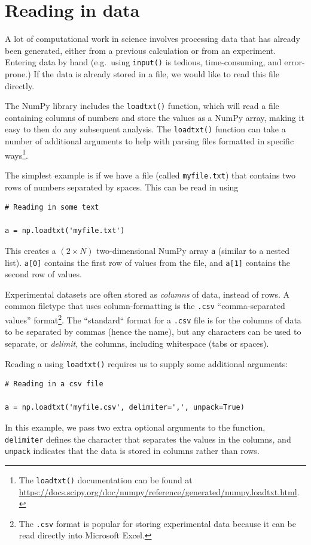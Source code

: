\documentclass[a4paper]{article}
\begin{document}
\section{Reading in data}

A lot of computational work in science involves processing data that has already been generated, either from a previous calculation or from an experiment. Entering data by hand (e.g.\ using \texttt{input()} is tedious, time-consuming, and error-prone.) If the data is already stored in a file, we would like to read this file directly.

The NumPy library includes the \texttt{loadtxt()} function, which will read a file containing columns of numbers and store the values as a NumPy array, making it easy to then do any subsequent analysis.
The \texttt{loadtxt()} function can take a number of additional arguments to help with parsing files formatted in specific ways\footnote{The \texttt{loadtxt()} documentation can be found at \url{https://docs.scipy.org/doc/numpy/reference/generated/numpy.loadtxt.html}.}.

The simplest example is if we have a file (called \texttt{myfile.txt}) that contains two rows of numbers separated by spaces. This can be read in using
\begin{lstlisting}
# Reading in some text

a = np.loadtxt('myfile.txt')
\end{lstlisting}
This creates a $(2\times N)$ two-dimensional NumPy array \texttt{a} (similar to a nested list). \texttt{a[0]} contains the first row of values from the file, and \texttt{a[1]} contains the second row of values.

Experimental datasets are often stored as \emph{columns} of data, instead of rows. A common filetype that uses column-formatting is the \texttt{.csv} ``comma-separated values'' format\footnote{The \texttt{.csv} format is popular for storing experimental data because it can be read directly into Microsoft Excel.}. The ``standard`` format for a \texttt{.csv} file is for the columns of data to be separated by commas (hence the name), but any characters can be used to separate, or \emph{delimit}, the columns, including whitespace (tabs or spaces).

Reading a  using \texttt{loadtxt()} requires us to supply some additional arguments:
\begin{lstlisting}
# Reading in a csv file

a = np.loadtxt('myfile.csv', delimiter=',', unpack=True)
\end{lstlisting}
In this example, we pass two extra optional arguments to the function, \texttt{delimiter} defines the character that separates the values in the columns, and \texttt{unpack} indicates that the data is stored in columns rather than rows.
\end{document}
